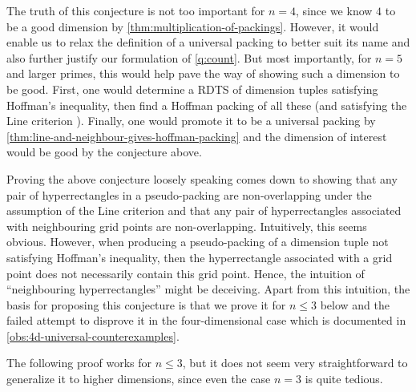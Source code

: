 \noindent The truth of this conjecture is not too important for $n = 4$, since we know $4$ to be a good dimension by \cref{thm:multiplication-of-packings}. However, it would enable us to relax the definition of a universal packing to better suit its name and also further justify our formulation of \cref{q:count}. But most importantly, for $n = 5$ and larger primes, this would help pave the way of showing such a dimension to be good. First, one would determine a RDTS of dimension tuples satisfying Hoffman's inequality, then find a Hoffman packing of all these (and satisfying the Line criterion ). Finally, one would promote it to be a universal packing by \cref{thm:line-and-neighbour-gives-hoffman-packing} and the dimension of interest would be good by the conjecture above.

Proving the above conjecture loosely speaking comes down to showing that any pair of hyperrectangles in a pseudo-packing are non-overlapping under the assumption of the Line criterion  and that any pair of hyperrectangles associated with neighbouring grid points are non-overlapping. Intuitively, this seems obvious. However, when producing a pseudo-packing of a dimension tuple not satisfying Hoffman's inequality, then the hyperrectangle associated with a grid point does not necessarily contain this grid point. Hence, the intuition of ``neighbouring hyperrectangles'' might be deceiving. Apart from this intuition, the basis for proposing this conjecture is that we prove it for $n \leq 3$ below and the failed attempt to disprove it in the four-dimensional case which is documented in \cref{obs:4d-universal-counterexamples}.

The following proof works for $n \leq 3$, but it does not seem very straightforward to generalize it to higher dimensions, since even the case $n = 3$ is quite tedious.

